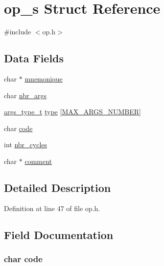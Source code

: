 \hypertarget{structop__s}{\section{op\-\_\-s Struct Reference}
\label{structop__s}
}


{\ttfamily \#include $<$op.\-h$>$}

\subsection*{Data Fields}
\begin{DoxyCompactItemize}
\item 
char $\ast$ \hyperlink{structop__s_a814bd20fa5dd2cbf82039374f08c0aa0}{mnemonique}
\item 
char \hyperlink{structop__s_aca9388e05ed27c0837deb9e4320a3bb3}{nbr\-\_\-args}
\item 
\hyperlink{op_8h_a4819392a6eb5f0799ea856ae99557fba}{args\-\_\-type\-\_\-t} \hyperlink{structop__s_a7fb3bacccb9ce7408a05193c7457a21d}{type} \mbox{[}\hyperlink{op_8h_acf0c8d7a85fa32c4c8be29d26bda0268}{M\-A\-X\-\_\-\-A\-R\-G\-S\-\_\-\-N\-U\-M\-B\-E\-R}\mbox{]}
\item 
char \hyperlink{structop__s_a29e1fac89cdd53c25682b8470ec6bcda}{code}
\item 
int \hyperlink{structop__s_a0b18918052dbe752738c906b8c285cfb}{nbr\-\_\-cycles}
\item 
char $\ast$ \hyperlink{structop__s_a25dae25c3bf9b28d54eb4df7afb2a491}{comment}
\end{DoxyCompactItemize}


\subsection{Detailed Description}


Definition at line 47 of file op.\-h.



\subsection{Field Documentation}
\hypertarget{structop__s_a29e1fac89cdd53c25682b8470ec6bcda}{
\subsubsection[{code}]{\setlength{\rightskip}{0pt plus 5cm}char code}}\label{structop__s_a29e1fac89cdd53c25682b8470ec6bcda}


